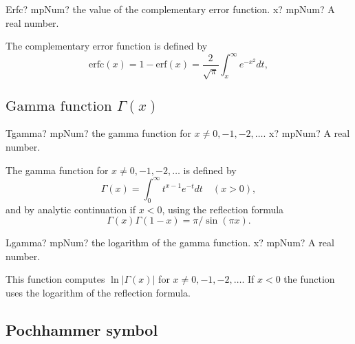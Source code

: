 \begin{mpFunctionsExtract}
	\mpFunctionOne
	{Erfc? mpNum? the value of the complementary error function.}
	{x? mpNum? A real number.}
\end{mpFunctionsExtract}


\vspace{0.3cm}
The complementary error function is defined by
\begin{equation}
	\text{erfc}(x) = 1-\text{erf}(x) = \frac{2}{\sqrt{\pi}} \int_x^\infty e^{-x^2} dt,
\end{equation}




\subsection{\texorpdfstring{$\text{Gamma function }\Gamma(x)$}{TGamma}}
\label{GammaFunction}

\begin{mpFunctionsExtract}
	\mpFunctionOne
	{Tgamma? mpNum? the gamma function for $x \neq 0, -1, -2,\ldots$.}
	{x? mpNum? A real number.}
\end{mpFunctionsExtract}


\vspace{0.3cm}
The gamma function for $x \neq 0, -1, -2,\ldots$ is defined by
\begin{equation}
	\Gamma(x)  = \int_{0}^{\infty} t^{x-1} e^{-t} dt \quad (x>0),
\end{equation}
and by analytic continuation if $x<0$, using the reflection formula
\begin{equation}
	\Gamma(x) \Gamma(1-x)  = \pi / \sin(\pi x).
\end{equation}



\begin{mpFunctionsExtract}
	\mpFunctionOne
	{Lgamma? mpNum? the logarithm of the gamma function.}
	{x? mpNum? A real number.}
\end{mpFunctionsExtract}

\vspace{0.3cm}
This function computes $\ln|\Gamma(x)|$ for $x \neq 0, -1, -2, \ldots$. If $x<0$ the function uses the logarithm of the reflection formula.




\subsection{Pochhammer symbol}
\label{PochhammerSymbol}

